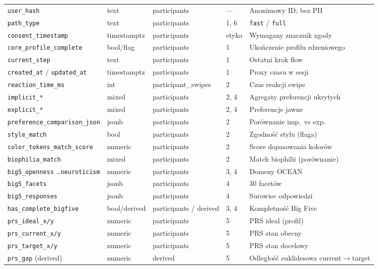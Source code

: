 \begin{longtable}{@{}p{3.6cm}p{1.8cm}p{2.4cm}p{1.4cm}p{3.2cm}@{}}
  \texttt{user\_hash} & text & participants & --- & Anonimowy ID; bez PII \\
  \texttt{path\_type} & text & participants & 1, 6 & \texttt{fast} / \texttt{full} \\
  \texttt{consent\_timestamp} & timestamptz & participants & etyka & Wymagany znacznik zgody \\
  \texttt{core\_profile\_complete} & bool/flag & participants & 1 & Ukończenie profilu rdzeniowego \\
  \texttt{current\_step} & text & participants & 1 & Ostatni krok flow \\
  \texttt{created\_at} / \texttt{updated\_at} & timestamptz & participants & 1 & Proxy czasu w sesji \\
  \addlinespace
  \texttt{reaction\_time\_ms} & int & participant\_swipes & 2 & Czas reakcji swipe \\
  \texttt{implicit\_*} & mixed & participants & 2, 4 & Agregaty preferencji ukrytych \\
  \texttt{explicit\_*} & mixed & participants & 2, 4 & Preferencje jawne \\
  \texttt{preference\_comparison\_json} & jsonb & participants & 2 & Porównanie imp.\ vs exp. \\
  \texttt{style\_match} & bool & participants & 2 & Zgodność stylu (flaga) \\
  \texttt{color\_tokens\_match\_score} & numeric & participants & 2 & Score dopasowania kolorów \\
  \texttt{biophilia\_match} & mixed & participants & 2 & Match biophilii (porównanie) \\
  \addlinespace
  \texttt{big5\_openness} \ldots \texttt{neuroticism} & numeric & participants & 3, 4 & Domeny OCEAN \\
  \texttt{big5\_facets} & jsonb & participants & 4 & 30 facetów \\
  \texttt{big5\_responses} & jsonb & participants & 4 & Surowiec odpowiedzi \\
  \texttt{has\_complete\_bigfive} & bool/derived & participants / derived & 3, 4 & Kompletność Big Five \\
  \addlinespace
  \texttt{prs\_ideal\_x/y} & numeric & participants & 5 & PRS ideal (profil) \\
  \texttt{prs\_current\_x/y} & numeric & participants & 5 & PRS stan obecny \\
  \texttt{prs\_target\_x/y} & numeric & participants & 5 & PRS stan docelowy \\
  \texttt{prs\_gap} (derived) & numeric & derived & 5 & Odległość euklidesowa current$\rightarrow$target \\

\end{longtable}
